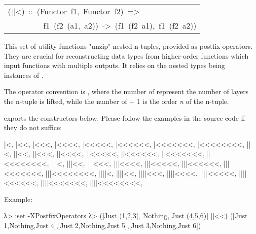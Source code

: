 \begin{haddockdesc}
\item[\begin{tabular}{@{}l}
(||<)\ ::\ (Functor\ f1,\ Functor\ f2)\ =>\\\ \ \ \ \ \ \ \ \ f1\ (f2\ (a1,\ a2))\ ->\ (f1\ (f2\ a1),\ f1\ (f2\ a2))
\end{tabular}]\haddockbegindoc
This set of utility functions "unzip" nested n-tuples, provided
 as postfix operators. They are crucial for reconstructing data
 types from higher-order functions which input functions with
 multiple outputs. It relies on the nested types being instances of
 .\par
The operator convention is \haddocktt{(|+<+)}, where the number of \haddocktt{|}
 represent the number of layers the n-tuple is lifted, while the
 number of \haddocktt{<} + 1 is the order \emph{n} of the n-tuple.\par
{} exports the constructors below. Please
 follow the examples in the source code if they do not suffice:\par
\begin{code}
   |<,    |<<,    |<<<,    |<<<<,    |<<<<<,    |<<<<<<,    |<<<<<<<,    |<<<<<<<<,
  ||<,   ||<<,   ||<<<,   ||<<<<,   ||<<<<<,   ||<<<<<<,   ||<<<<<<<,   ||<<<<<<<<,
 |||<,  |||<<,  |||<<<,  |||<<<<,  |||<<<<<,  |||<<<<<<,  |||<<<<<<<,  |||<<<<<<<<,  
||||<, ||||<<, ||||<<<, ||||<<<<, ||||<<<<<, ||||<<<<<<, ||||<<<<<<<, ||||<<<<<<<<, \end{code}
Example:\par
\begin{interactive}
λ> :set -XPostfixOperators
λ> ([Just (1,2,3), Nothing, Just (4,5,6)] ||<<)
([Just 1,Nothing,Just 4],[Just 2,Nothing,Just 5],[Just 3,Nothing,Just 6])

\end{interactive}
\end{haddockdesc}
